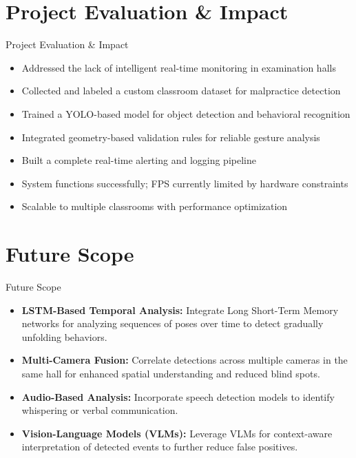 \documentclass{beamer}
\begin{document}
\section{Project Evaluation \& Impact}
\begin{frame}{Project Evaluation \& Impact}
\footnotesize
\begin{itemize}
    \item Addressed the lack of intelligent real-time monitoring in examination halls
    \item Collected and labeled a custom classroom dataset for malpractice detection
    \item Trained a YOLO-based model for object detection and behavioral recognition
    \item Integrated geometry-based validation rules for reliable gesture analysis
    \item Built a complete real-time alerting and logging pipeline
    \item System functions successfully; FPS currently limited by hardware constraints
    \item Scalable to multiple classrooms with performance optimization
\end{itemize}
\end{frame}

\section{Future Scope}
\begin{frame}{Future Scope}
\begin{itemize}
    \item \textbf{LSTM-Based Temporal Analysis:} Integrate Long Short-Term Memory networks for analyzing sequences of poses over time to detect gradually unfolding behaviors.
    \item \textbf{Multi-Camera Fusion:} Correlate detections across multiple cameras in the same hall for enhanced spatial understanding and reduced blind spots.
    \item \textbf{Audio-Based Analysis:} Incorporate speech detection models to identify whispering or verbal communication.
    \item \textbf{Vision-Language Models (VLMs):} Leverage VLMs for context-aware interpretation of detected events to further reduce false positives.
\end{itemize}
\end{frame}
\end{document}
